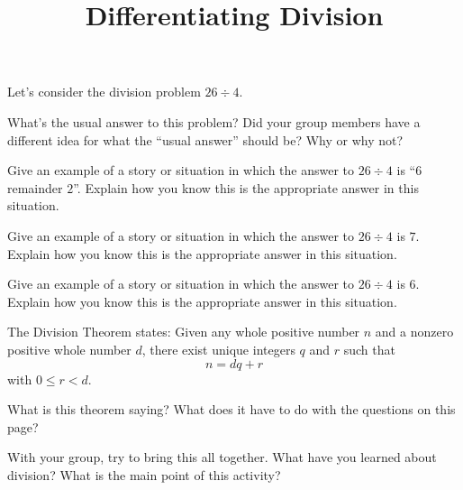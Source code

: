 \documentclass[handout,nooutcomes, noauthor]{ximera}
\title{Differentiating Division}
\begin{document}
\begin{abstract}
\end{abstract}
\maketitle

Let's consider the division problem $26 \div 4$.

\begin{question}
What's the usual answer to this problem? Did your group members have a different idea for what the ``usual answer'' should be?  Why or why not?

\end{question}


\begin{problem}
Give an example of a story or situation in which the answer to $26 \div 4$ is ``$6$ remainder $2$''.  Explain how you know this is the appropriate answer in this situation.
\end{problem}

\begin{problem}
Give an example of a story or situation in which the answer to $26 \div 4$ is $7$.  Explain how you know this is the appropriate answer in this situation.
\end{problem}


\begin{problem}
Give an example of a story or situation in which the answer to $26 \div 4$ is $6$.  Explain how you know this is the appropriate answer in this situation.
\end{problem}


The Division Theorem states: Given any whole positive number $n$ and a nonzero positive whole number $d$, there exist unique integers $q$ and $r$ such that 
\[
n = dq + r
\]
with $0 \leq r < d$.

\begin{question}
What is this theorem saying?  What does it have to do with the questions on this page?
\end{question}

\begin{problem}
With your group, try to bring this all together.  What have you learned about division?  What is the main point of this activity?
\end{problem}
\end{document}

